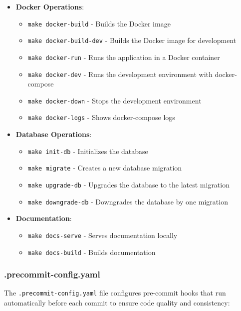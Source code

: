 \begin{itemize}
    \item \textbf{Docker Operations}:
    \begin{itemize}
        \item \texttt{make docker-build} - Builds the Docker image
        \item \texttt{make docker-build-dev} - Builds the Docker image for development
        \item \texttt{make docker-run} - Runs the application in a Docker container
        \item \texttt{make docker-dev} - Runs the development environment with docker-compose
        \item \texttt{make docker-down} - Stops the development environment
        \item \texttt{make docker-logs} - Shows docker-compose logs
    \end{itemize}
    
    \item \textbf{Database Operations}:
    \begin{itemize}
        \item \texttt{make init-db} - Initializes the database
        \item \texttt{make migrate} - Creates a new database migration
        \item \texttt{make upgrade-db} - Upgrades the database to the latest migration
        \item \texttt{make downgrade-db} - Downgrades the database by one migration
    \end{itemize}
    
    \item \textbf{Documentation}:
    \begin{itemize}
        \item \texttt{make docs-serve} - Serves documentation locally
        \item \texttt{make docs-build} - Builds documentation
    \end{itemize}
\end{itemize}

\subsubsection{.precommit-config.yaml}
The \texttt{.precommit-config.yaml} file configures pre-commit hooks that run automatically before each commit to ensure code quality and consistency:

